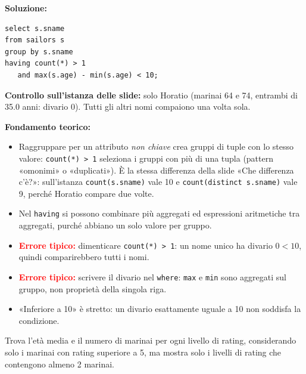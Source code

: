 \documentclass[12pt, a4paper]{article}
\begin{document}
\textbf{Soluzione:}
\begin{verbatim}
select s.sname
from sailors s
group by s.sname
having count(*) > 1
   and max(s.age) - min(s.age) < 10;
\end{verbatim}
\textbf{Controllo sull'istanza delle slide:} solo Horatio (marinai 64 e 74, entrambi di 35.0 anni: divario 0). Tutti gli altri nomi compaiono una volta sola.

\textbf{Fondamento teorico:}
\begin{itemize}
\item Raggruppare per un attributo \emph{non chiave} crea gruppi di tuple con lo stesso valore: \texttt{count(*) > 1} seleziona i gruppi con più di una tupla (pattern «omonimi» o «duplicati»). È la stessa differenza della slide «Che differenza c'è?»: sull'istanza \texttt{count(s.sname)} vale 10 e \texttt{count(distinct s.sname)} vale 9, perché Horatio compare due volte.
\item Nel \texttt{having} si possono combinare più aggregati ed espressioni aritmetiche tra aggregati, purché abbiano un solo valore per gruppo.
\item \textcolor{red}{\textbf{Errore tipico:}} dimenticare \texttt{count(*) > 1}: un nome unico ha divario $0<10$, quindi comparirebbero tutti i nomi.
\item \textcolor{red}{\textbf{Errore tipico:}} scrivere il divario nel \texttt{where}: \texttt{max} e \texttt{min} sono aggregati sul gruppo, non proprietà della singola riga.
\item «Inferiore a 10» è stretto: un divario esattamente uguale a 10 non soddisfa la condizione.
\end{itemize}

\begin{tcolorbox}[colback=lightergray!10, colframe=tocsec, title=\textbf{Esercizio SQL 4}]
Trova l'età media e il numero di marinai per ogni livello di rating, considerando solo i marinai con rating superiore a 5, ma mostra solo i livelli di rating che contengono almeno 2 marinai.
\end{tcolorbox}
\end{document}
